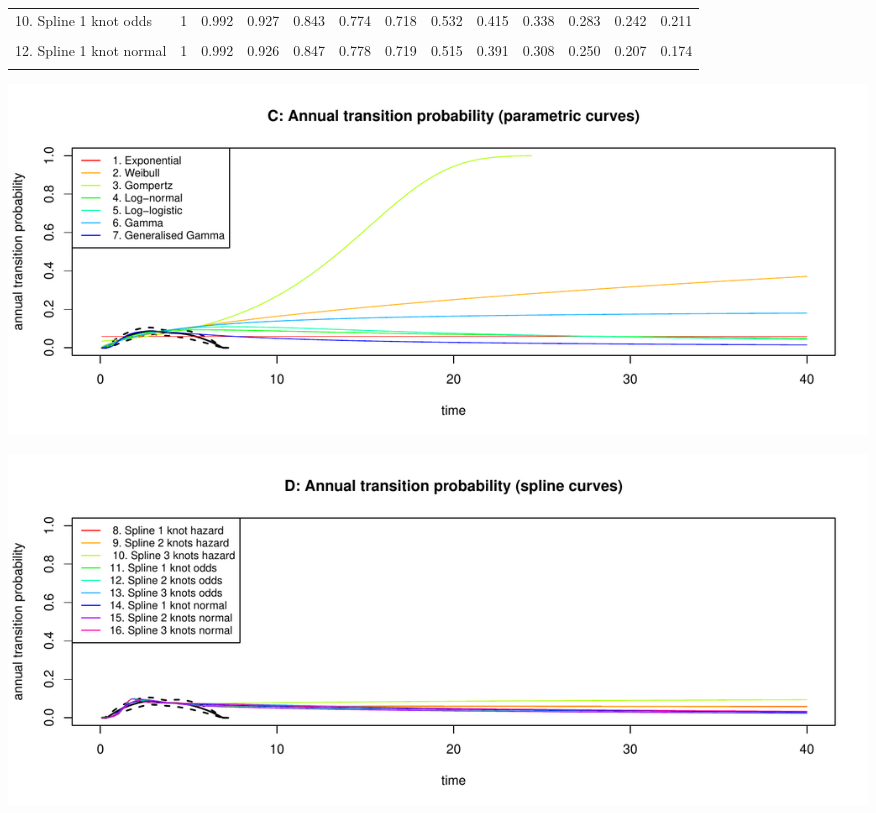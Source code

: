 \documentclass[]{article}
\begin{document}
{\begin{tabular}{lrrrrrrrrrrrr}
10. Spline 1 knot odds & 1 & 0.992 & 0.927 & 0.843 & 0.774 & 0.718 & 0.532 & 0.415 & 0.338 & 0.283 & 0.242 & 0.211\\
\cellcolor{gray!6}{11. Spline 2 knots odds} & \cellcolor{gray!6}{1} & \cellcolor{gray!6}{0.992} & \cellcolor{gray!6}{0.928} & \cellcolor{gray!6}{0.843} & \cellcolor{gray!6}{0.774} & \cellcolor{gray!6}{0.718} & \cellcolor{gray!6}{0.533} & \cellcolor{gray!6}{0.418} & \cellcolor{gray!6}{0.340} & \cellcolor{gray!6}{0.285} & \cellcolor{gray!6}{0.245} & \cellcolor{gray!6}{0.213}\\
12. Spline 1 knot normal & 1 & 0.992 & 0.926 & 0.847 & 0.778 & 0.719 & 0.515 & 0.391 & 0.308 & 0.250 & 0.207 & 0.174\\
\cellcolor{gray!6}{13. Spline 2 knots normal} & \cellcolor{gray!6}{1} & \cellcolor{gray!6}{0.992} & \cellcolor{gray!6}{0.929} & \cellcolor{gray!6}{0.842} & \cellcolor{gray!6}{0.773} & \cellcolor{gray!6}{0.718} & \cellcolor{gray!6}{0.538} & \cellcolor{gray!6}{0.426} & \cellcolor{gray!6}{0.350} & \cellcolor{gray!6}{0.295} & \cellcolor{gray!6}{0.253} & \cellcolor{gray!6}{0.220}\\
\bottomrule
\end{tabular}}

\begin{flushleft}\includegraphics[height=0.29\textheight]{Images/validate_extrapolation1-3} \end{flushleft}

\begin{flushleft}\includegraphics[height=0.29\textheight]{Images/validate_extrapolation1-4} \end{flushleft}
\end{document}
